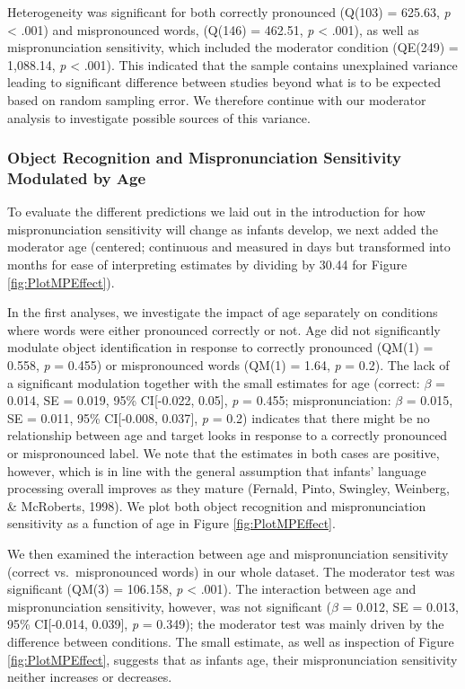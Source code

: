 \documentclass[man]{apa6}
\begin{document}
Heterogeneity was significant for both correctly pronounced (Q(103) = 625.63, \emph{p} \textless{} .001) and mispronounced words, (Q(146) = 462.51, \emph{p} \textless{} .001), as well as mispronunciation sensitivity, which included the moderator condition (QE(249) = 1,088.14, \emph{p} \textless{} .001). This indicated that the sample contains unexplained variance leading to significant difference between studies beyond what is to be expected based on random sampling error. We therefore continue with our moderator analysis to investigate possible sources of this variance.

\hypertarget{object-recognition-and-mispronunciation-sensitivity-modulated-by-age}{%
\subsubsection{Object Recognition and Mispronunciation Sensitivity Modulated by Age}\label{object-recognition-and-mispronunciation-sensitivity-modulated-by-age}}

To evaluate the different predictions we laid out in the introduction for how mispronunciation sensitivity will change as infants develop, we next added the moderator age (centered; continuous and measured in days but transformed into months for ease of interpreting estimates by dividing by 30.44 for Figure \ref{fig:PlotMPEffect}).

In the first analyses, we investigate the impact of age separately on conditions where words were either pronounced correctly or not. Age did not significantly modulate object identification in response to correctly pronounced (QM(1) = 0.558, \emph{p} = 0.455) or mispronounced words (QM(1) = 1.64, \emph{p} = 0.2). The lack of a significant modulation together with the small estimates for age (correct: \(\beta\) = 0.014, SE = 0.019, 95\% CI{[}-0.022, 0.05{]}, \emph{p} = 0.455; mispronunciation: \(\beta\) = 0.015, SE = 0.011, 95\% CI{[}-0.008, 0.037{]}, \emph{p} = 0.2) indicates that there might be no relationship between age and target looks in response to a correctly pronounced or mispronounced label. We note that the estimates in both cases are positive, however, which is in line with the general assumption that infants' language processing overall improves as they mature (Fernald, Pinto, Swingley, Weinberg, \& McRoberts, 1998). We plot both object recognition and mispronunciation sensitivity as a function of age in Figure \ref{fig:PlotMPEffect}.

We then examined the interaction between age and mispronunciation sensitivity (correct vs.~mispronounced words) in our whole dataset. The moderator test was significant (QM(3) = 106.158, \emph{p} \textless{} .001). The interaction between age and mispronunciation sensitivity, however, was not significant (\(\beta\) = 0.012, SE = 0.013, 95\% CI{[}-0.014, 0.039{]}, \emph{p} = 0.349); the moderator test was mainly driven by the difference between conditions. The small estimate, as well as inspection of Figure \ref{fig:PlotMPEffect}, suggests that as infants age, their mispronunciation sensitivity neither increases or decreases.
\end{document}
